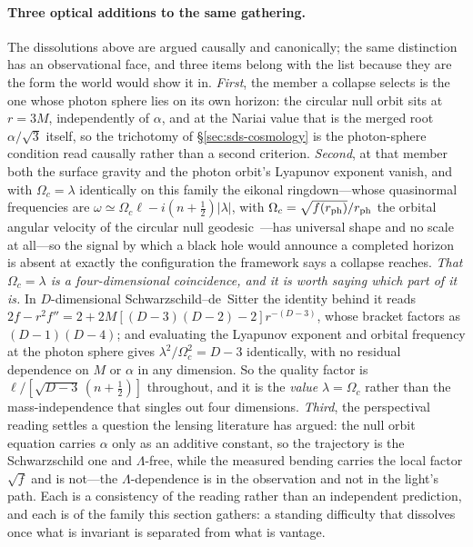 \documentclass[11pt,a4paper]{article}
\theoremstyle{plain}
\theoremstyle{definition}
\theoremstyle{remark}
\begin{document}
\paragraph{Three optical additions to the same gathering.} The dissolutions above are argued causally and
canonically; the same distinction has an observational face, and three items belong with the list because they
are the form the world would show it in. \emph{First}, the member a collapse selects is the one whose photon
sphere lies on its own horizon: the circular null orbit sits at $r=3M$, independently of $\alpha$, and at the
Nariai value that is the merged root $\alpha/\sqrt3$ itself, so the trichotomy of \S\ref{sec:sds-cosmology} is
the photon-sphere condition read causally rather than a second criterion.
\emph{Second}, at that member both the surface gravity and the photon orbit's Lyapunov exponent vanish, and with
$\Omega_{c}=\lambda$ identically on this family the eikonal ringdown---whose quasinormal frequencies are
$\omega\simeq\Omega_{c}\ell-i(n+\tfrac12)|\lambda|$, with $\Omega_{c}=\sqrt{f(r_{\rm ph})}/r_{\rm ph}$ the
orbital angular velocity of the circular null geodesic~\cite{Cardoso2009}---has universal shape and no scale at
all---so the signal by which a black hole would announce a completed horizon is absent
at exactly the configuration the framework says a collapse reaches. \emph{That $\Omega_{c}=\lambda$ is a four-dimensional coincidence, and it is worth saying which part of it is.} In $D$-dimensional Schwarzschild--de~Sitter the identity behind it reads $2f-r^{2}f''=2+2M[(D-3)(D-2)-2]r^{-(D-3)}$, whose bracket factors as $(D-1)(D-4)$; and evaluating the Lyapunov exponent and orbital frequency at the photon sphere gives $\lambda^{2}/\Omega_{c}^{2}=D-3$ identically, with no residual dependence on $M$ or $\alpha$ in any dimension. So the quality factor is $\ell/[\sqrt{D-3}\,(n+\tfrac12)]$ throughout, and it is the \emph{value} $\lambda=\Omega_{c}$ rather than the mass-independence that singles out four dimensions. \emph{Third}, the perspectival reading
settles a question the lensing literature has argued: the null orbit equation carries $\alpha$ only as an
additive constant, so the trajectory is the Schwarzschild one and $\Lambda$-free, while the measured bending
carries the local factor $\sqrt{f}$ and is not---the $\Lambda$-dependence is in the observation and not in the
light's path. Each is a consistency of the reading rather than an independent
prediction, and each is of the family this section gathers: a standing difficulty that dissolves once what is
invariant is separated from what is vantage.
\end{document}
